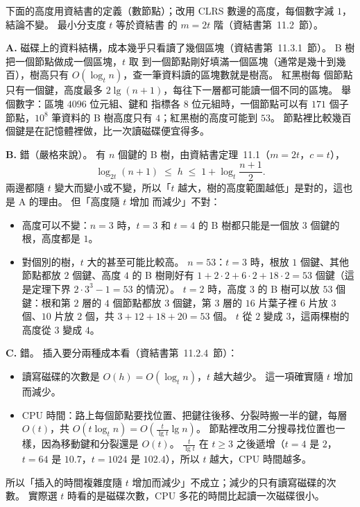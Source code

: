 \begin{pastsoln}
下面的高度用資結書的定義（數節點）；改用 CLRS 數邊的高度，每個數字減 $1$，結論不變。 最小分支度 $t$ 等於資結書
的 $m = 2t$ 階（資結書第~11.2~節）。

\textbf{A.} 磁碟上的資料結構，成本幾乎只看讀了幾個區塊（資結書第~11.3.1~節）。 B 樹把一個節點做成一個區塊，$t$ 取
到一個節點剛好填滿一個區塊（通常是幾十到幾百），樹高只有 $O(\log_t n)$，查一筆資料讀的區塊數就是樹高。 紅黑樹每
個節點只有一個鍵，高度最多 $2\lg(n+1)$，每往下一層都可能讀一個不同的區塊。 舉個數字：區塊 $4096$ 位元組、鍵和
指標各 $8$ 位元組時，一個節點可以有 $171$ 個子節點，$10^8$ 筆資料的 B 樹高度只有 $4$；紅黑樹的高度可能到 $53$。
節點裡比較幾百個鍵是在記憶體裡做，比一次讀磁碟便宜得多。

\textbf{B.} 錯（嚴格來說）。 有 $n$ 個鍵的 B 樹，由資結書定理~11.1（$m = 2t$，$c = t$），
\[
\log_{2t}(n + 1) \;\le\; h \;\le\; 1 + \log_t \frac{n + 1}{2}.
\]
兩邊都隨 $t$ 變大而變小或不變，所以「$t$ 越大，樹的高度範圍越低」是對的，這也是 A 的理由。 但「高度隨 $t$ 增加
而減少」不對：
\begin{itemize}
\item 高度可以不變：$n = 3$ 時，$t = 3$ 和 $t = 4$ 的 B 樹都只能是一個放 $3$ 個鍵的根，高度都是 $1$。
\item 對個別的樹，$t$ 大的甚至可能比較高。 $n = 53$：$t = 3$ 時，根放 $1$ 個鍵、其他節點都放 $2$ 個鍵、高度 $4$ 的
B 樹剛好有 $1 + 2 \cdot 2 + 6 \cdot 2 + 18 \cdot 2 = 53$ 個鍵（這是定理下界 $2 \cdot 3^3 - 1 = 53$ 的情況）。
$t = 2$ 時，高度 $3$ 的 B 樹可以放 $53$ 個鍵：根和第 $2$ 層的 $4$ 個節點都放 $3$ 個鍵，第 $3$ 層的 $16$ 片葉子裡
$6$ 片放 $3$ 個、$10$ 片放 $2$ 個，共 $3 + 12 + 18 + 20 = 53$ 個。 $t$ 從 $2$ 變成 $3$，這兩棵樹的高度從 $3$ 變成
$4$。
\end{itemize}

\textbf{C.} 錯。 插入要分兩種成本看（資結書第~11.2.4~節）：
\begin{itemize}
\item 讀寫磁碟的次數是 $O(h) = O(\log_t n)$，$t$ 越大越少。 這一項確實隨 $t$ 增加而減少。
\item CPU 時間：路上每個節點要找位置、把鍵往後移、分裂時搬一半的鍵，每層 $O(t)$，共
$O(t \log_t n) = O\!\left(\frac{t}{\lg t} \lg n\right)$。 節點裡改用二分搜尋找位置也一樣，因為移動鍵和分裂還是
$O(t)$。 $\frac{t}{\lg t}$ 在 $t \ge 3$ 之後遞增（$t = 4$ 是 $2$，$t = 64$ 是 $10.7$，$t = 1024$ 是 $102.4$），所以
$t$ 越大，CPU 時間越多。
\end{itemize}
所以「插入的時間複雜度隨 $t$ 增加而減少」不成立；減少的只有讀寫磁碟的次數。 實際選 $t$ 時看的是磁碟次數，CPU
多花的時間比起讀一次磁碟很小。
\end{pastsoln}
